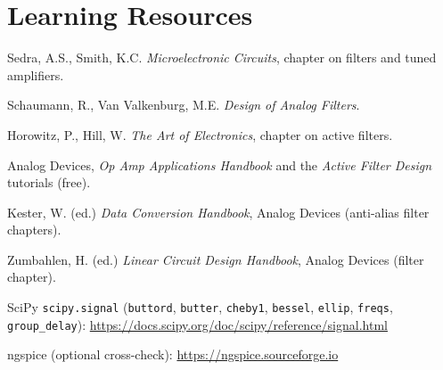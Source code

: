\documentclass[11pt,a4paper]{article}
\begin{document}
\section*{Learning Resources}
\begin{resources}
  \item Sedra, A.S., Smith, K.C. \emph{Microelectronic Circuits}, chapter on filters and tuned amplifiers.
  \item Schaumann, R., Van Valkenburg, M.E. \emph{Design of Analog Filters}.
  \item Horowitz, P., Hill, W. \emph{The Art of Electronics}, chapter on active filters.
  \item Analog Devices, \emph{Op Amp Applications Handbook} and the \emph{Active Filter Design} tutorials (free).
\end{resources}
\begin{resources}
  \item Kester, W. (ed.) \emph{Data Conversion Handbook}, Analog Devices (anti-alias filter chapters).
  \item Zumbahlen, H. (ed.) \emph{Linear Circuit Design Handbook}, Analog Devices (filter chapter).
\end{resources}
\begin{resources}
  \item SciPy \texttt{scipy.signal} (\texttt{buttord}, \texttt{butter}, \texttt{cheby1}, \texttt{bessel}, \texttt{ellip}, \texttt{freqs}, \texttt{group\_delay}): \url{https://docs.scipy.org/doc/scipy/reference/signal.html}
  \item ngspice (optional cross-check): \url{https://ngspice.sourceforge.io}
\end{resources}

\evaluation
\end{document}
